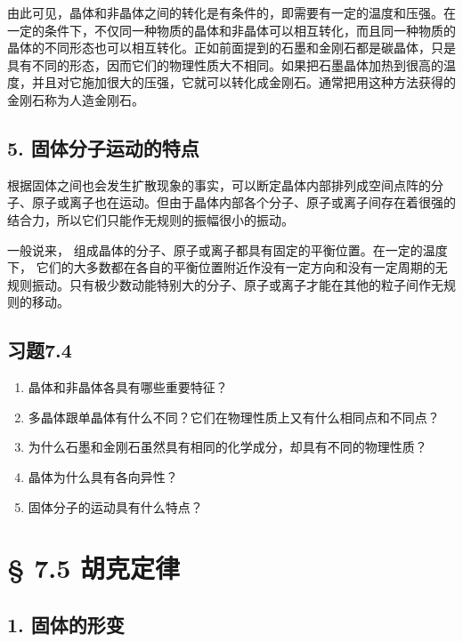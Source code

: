 由此可见，晶体和非晶体之间的转化是有条件的，即需要有一定的温度和压强。在一定的条件下，不仅同一种物质的晶体和非晶体可以相互转化，而且同一种物质的晶体的不同形态也可以相互转化。正如前面提到的石墨和金刚石都是碳晶体，只是具有不同的形态，因而它们的物理性质大不相同。如果把石墨晶体加热到很高的温度，并且对它施加很大的压强，它就可以转化成金刚石。通常把用这种方法获得的金刚石称为人造金刚石。

\subsection{5.
固体分子运动的特点}\label{ux56faux4f53ux5206ux5b50ux8fd0ux52a8ux7684ux7279ux70b9}

根据固体之间也会发生扩散现象的事实，可以断定晶体内部排列成空间点阵的分子、原子或离子也在运动。但由于晶体内部各个分子、原子或离子间存在着很强的结合力，所以它们只能作无规则的振幅很小的振动。

一般说来，
组成晶体的分子、原子或离子都具有固定的平衡位置。在一定的温度下，
它们的大多数都在各自的平衡位置附近作没有一定方向和没有一定周期的无规则振动。只有极少数动能特别大的分子、原子或离子才能在其他的粒子间作无规则的移动。

\subsection{习题7.4}\label{ux4e60ux98987.4}

\begin{enumerate}
\def\labelenumi{\arabic{enumi}.}
\item
  晶体和非晶体各具有哪些重要特征？
\item
  多晶体跟单晶体有什么不同？它们在物理性质上又有什么相同点和不同点？
\item
  为什么石墨和金刚石虽然具有相同的化学成分，却具有不同的物理性质？
\item
  晶体为什么具有各向异性？
\item
  固体分子的运动具有什么特点？
\end{enumerate}

\section{§ 7.5 胡克定律}\label{ux80e1ux514bux5b9aux5f8b}

\subsection{1. 固体的形变}\label{ux56faux4f53ux7684ux5f62ux53d8}

